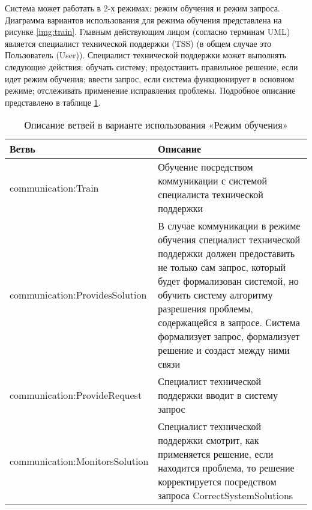 Система может работать в 2-х режимах: режим обучения и режим запроса. Диаграмма вариантов использования для режима обучения представлена на рисунке \ref{img:train}. Главным действующим лицом (согласно терминам UML) является специалист технической поддержки (TSS) (в общем случае это Пользователь (User)). Специалист технической поддержки может выполнять следующие действия: обучать систему; предоставить правильное решение, если идет режим обучения; ввести запрос, если система функционирует в основном режиме; отслеживать применение исправления проблемы. 
Подробное описание представлено в таблице \ref{TrainUseCaseTable}. \par

\begin{table} [htbp]
  \center
  \parbox{15cm}{\caption{Описание ветвей в варианте использования «Режим обучения» }\label{TrainUseCaseTable}}
  \begin{tabular}{| p{7cm} | p{7cm} |}
  
  \hline
\textbf{Ветвь} & \textbf{Описание} \\
  
    \hline
communication:Train	& Обучение посредством коммуникации с системой специалиста технической поддержки \\
  \hline
communication:ProvidesSolution  & В случае коммуникации в режиме обучения специалист технической поддержки должен предоставить не только сам запрос, который будет формализован системой, но обучить систему алгоритму разрешения проблемы, содержащейся в запросе. Система формализует запрос, формализует решение и создаст между ними связи \\
  \hline
communication:ProvideRequest & Специалист технической поддержки вводит в систему запрос \\
  \hline
communication:MonitorsSolution  & Специалист технической поддержки смотрит, как применяется решение, если находится проблема, то решение корректируется посредством запроса CorrectSystemSolutions \\
  \hline
 
  \end{tabular}
\end{table}

